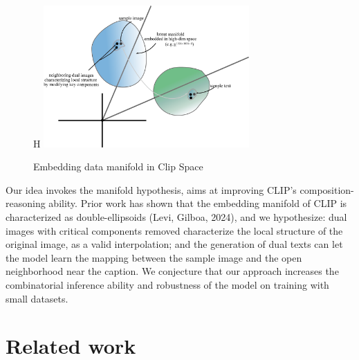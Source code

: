 \documentclass[11pt,letterpaper]{article}
\begin{document}
\begin{figure}{H} %
    \centering
    \includegraphics[width=0.7\textwidth]{midterm_report/assets/manifold.png}
    \caption{Embedding data manifold in Clip Space}
\end{figure}

Our idea invokes the manifold hypothesis, aims at improving CLIP's composition-reasoning ability. Prior work has shown that the embedding manifold of CLIP is characterized as double-ellipsoids\cite{levi2024doubleellipsoidgeometryclip} (Levi, Gilboa, 2024), and we hypothesize: dual images with critical components removed characterize the local structure of the original image, as a valid interpolation; and the generation of dual texts can let the model learn the mapping between the sample image and the open neighborhood near the caption. We conjecture that our approach increases the combinatorial inference ability and robustness of the model on training with small datasets.

\section{Related work}
\end{document}
